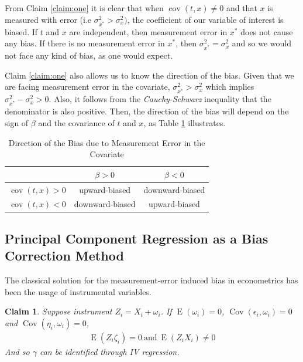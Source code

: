 \documentclass[10pt]{article}
\newtheorem{claim}{Claim}
\def\b{\beta}
\begin{document}
       From Claim \ref{claim:one} it is clear that when $\operatorname{cov}(t,x)\neq 0$ and that $x$ is measured with error (i.e $\sigma_{x^*}^2>\sigma_x^2)$, the coefficient of our variable of interest is biased. If $t$ and $x$ are independent, then measurement error in $x^*$ does not cause any bias. If there is no measurement error in $x^*$, then $\sigma^2_{x^*}=\sigma^2_x$ and so we would not face any kind of bias, as one would expect.
        
        Claim \ref{claim:one} also allows us to know the direction of the bias. Given that we are facing measurement error in the covariate, $\sigma^2_{x^*}>\sigma^2_x$ which implies $\sigma^2_{x^*}-\sigma^2_x>0$. Also, it follows from the \textit{Cauchy-Schwarz} inequality that the denominator is also positive. Then, the direction of the bias will depend on the sign of $\beta$ and the covariance of $t$ and $x$, as Table \ref{bias_direction} illustrates.
        
        \begin{table}[H]
            \centering
            \caption{Direction of the Bias due to Measurement Error in the Covariate}
            \label{bias_direction}
            \begin{tabular}{|c|c|c|}\hline \hline
              & $\b>0$  & $\b<0$ \\ \hline
             $\operatorname{cov}(t,x)>0$ & upward-biased & downward-biased \\ \hline
             $\operatorname{cov}(t,x)<0$ & downward-biased & upward-biased \\ \hline
            \end{tabular} 
        \end{table}
        
    \subsection*{Principal Component Regression as a Bias Correction Method}
        
        The classical solution for the measurement-error induced bias in econometrics has been the usage of instrumental variables.

        \begin{claim}
        Suppose instrument $ Z_i=X_i+\omega_i$. If $\operatorname{E}(\omega_i)=0$, $\operatorname{Cov}(\epsilon_i,\omega_i)=0$ and $\operatorname{Cov}(\eta_i,\omega_i)=0$,
        \begin{align}
        \operatorname{E}(Z_i\zeta_i)=0 \ \text{and} \  \operatorname{E}(Z_iX_i)\neq0
        \end{align}
        And so $\gamma$ can be identified through IV regression.
        \end{claim}
\end{document}
